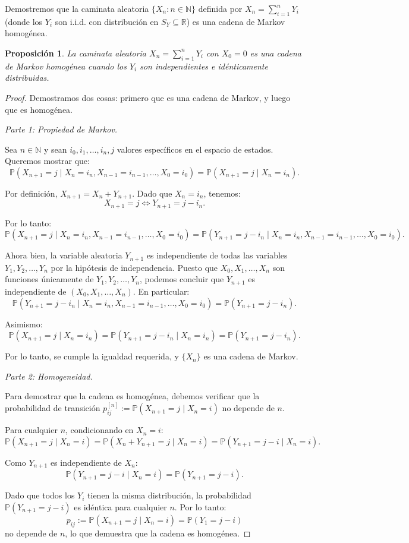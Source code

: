 \documentclass[12pt]{book}
\newtheorem{proposition}{Proposición}[chapter]
\begin{document}
Demostremos que la caminata aleatoria $\{X_n : n \in \mathbb{N}\}$ definida por $X_n = \sum_{i=1}^n Y_i$ (donde los $Y_i$ son i.i.d. con distribución en $S_Y \subseteq \mathbb{R}$) es una cadena de Markov homogénea.

\begin{proposition}
La caminata aleatoria $X_n = \sum_{i=1}^n Y_i$ con $X_0 = 0$ es una cadena de Markov homogénea cuando los $Y_i$ son independientes e idénticamente distribuidas.
\end{proposition}

\begin{proof}
Demostramos dos cosas: primero que es una cadena de Markov, y luego que es homogénea.

\textit{Parte 1: Propiedad de Markov.} 

Sea $n \in \mathbb{N}$ y sean $i_0, i_1, \ldots, i_n, j$ valores específicos en el espacio de estados. Queremos mostrar que:
\[
\mathbb{P}(X_{n+1} = j \mid X_n = i_n, X_{n-1} = i_{n-1}, \ldots, X_0 = i_0) = \mathbb{P}(X_{n+1} = j \mid X_n = i_n).
\]

Por definición, $X_{n+1} = X_n + Y_{n+1}$. Dado que $X_n = i_n$, tenemos:
\[
X_{n+1} = j \iff Y_{n+1} = j - i_n.
\]

Por lo tanto:
\[
\mathbb{P}(X_{n+1} = j \mid X_n = i_n, X_{n-1} = i_{n-1}, \ldots, X_0 = i_0) = \mathbb{P}(Y_{n+1} = j - i_n \mid X_n = i_n, X_{n-1} = i_{n-1}, \ldots, X_0 = i_0).
\]

Ahora bien, la variable aleatoria $Y_{n+1}$ es independiente de todas las variables $Y_1, Y_2, \ldots, Y_n$ por la hipótesis de independencia. Puesto que $X_0, X_1, \ldots, X_n$ son funciones únicamente de $Y_1, Y_2, \ldots, Y_n$, podemos concluir que $Y_{n+1}$ es independiente de $(X_0, X_1, \ldots, X_n)$. En particular:
\[
\mathbb{P}(Y_{n+1} = j - i_n \mid X_n = i_n, X_{n-1} = i_{n-1}, \ldots, X_0 = i_0) = \mathbb{P}(Y_{n+1} = j - i_n).
\]

Asimismo:
\[
\mathbb{P}(X_{n+1} = j \mid X_n = i_n) = \mathbb{P}(Y_{n+1} = j - i_n \mid X_n = i_n) = \mathbb{P}(Y_{n+1} = j - i_n).
\]

Por lo tanto, se cumple la igualdad requerida, y $\{X_n\}$ es una cadena de Markov.

\textit{Parte 2: Homogeneidad.}

Para demostrar que la cadena es homogénea, debemos verificar que la probabilidad de transición $p_{ij}^{[n]} := \mathbb{P}(X_{n+1} = j \mid X_n = i)$ no depende de $n$.

Para cualquier $n$, condicionando en $X_n = i$:
\[
\mathbb{P}(X_{n+1} = j \mid X_n = i) = \mathbb{P}(X_n + Y_{n+1} = j \mid X_n = i) = \mathbb{P}(Y_{n+1} = j - i \mid X_n = i).
\]

Como $Y_{n+1}$ es independiente de $X_n$:
\[
\mathbb{P}(Y_{n+1} = j - i \mid X_n = i) = \mathbb{P}(Y_{n+1} = j - i).
\]

Dado que todos los $Y_i$ tienen la misma distribución, la probabilidad $\mathbb{P}(Y_{n+1} = j - i)$ es idéntica para cualquier $n$. Por lo tanto:
\[
p_{ij} := \mathbb{P}(X_{n+1} = j \mid X_n = i) = \mathbb{P}(Y_1 = j - i)
\]
no depende de $n$, lo que demuestra que la cadena es homogénea. 
\end{proof}
\end{document}
